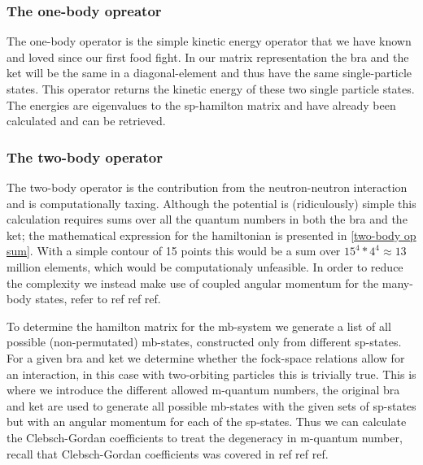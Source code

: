 \subsubsection{The one-body opreator}
The one-body operator is the simple kinetic energy operator that we have known and loved since our first food fight. 
 In our matrix representation the bra and the ket will be the same in a diagonal-element and thus have the same single-particle states.
 This operator returns the kinetic energy of these two single particle states. 
 The energies are eigenvalues to the sp-hamilton matrix and have already been calculated and can be retrieved.

\subsubsection{The two-body operator}
The two-body operator is the contribution from the neutron-neutron interaction and is computationally taxing. Although the potential is (ridiculously) simple this calculation requires sums over all the quantum numbers in both the bra and the ket; the mathematical expression for the hamiltonian is presented in \cref{two-body op sum}. 
With a simple contour of 15 points this would be a sum over $15^4*4^4 \approx 13$ million elements, which would be computationaly unfeasible.
In order to reduce the complexity we instead make use of coupled angular momentum for the many-body states, refer to ref ref ref.



To determine the hamilton matrix  for the mb-system we generate a list of all possible (non-permutated) mb-states, constructed only from different sp-states.
For a given bra and ket we determine whether the fock-space relations allow for an interaction, in this case with two-orbiting particles this is trivially true.
This is where we introduce the different allowed m-quantum numbers, the original bra and ket are used to generate all possible mb-states with the given sets of sp-states but with an angular momentum for each of the sp-states.
Thus we can calculate the Clebsch-Gordan coefficients to treat the degeneracy in m-quantum number, recall that Clebsch-Gordan coefficients was covered in ref ref ref.

